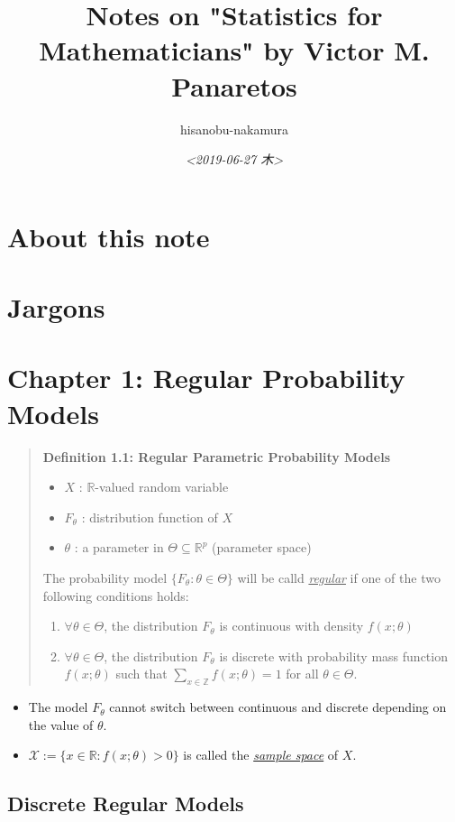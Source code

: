 \documentclass{article}
\author{hisanobu-nakamura}
\date{\textit{<2019-06-27 木>}}
\title{Notes on "Statistics for Mathematicians" by Victor M. Panaretos}
\begin{document}
\maketitle
\tableofcontents




\section{About this note}
\label{sec-1}

\section{Jargons}
\label{sec-2}

\section{Chapter 1: Regular Probability Models}
\label{sec-3}
\begin{quote}
\textbf{Definition 1.1: Regular Parametric Probability Models}\\
\begin{itemize}
\item $X$ : $\mathbb{R}$-valued random variable
\item $F_{\theta}$ : distribution function of $X$
\item $\theta$ : a parameter in $\Theta \subseteq \mathbb{R}^{p}$ (parameter space)
\end{itemize}

The probability model $\{F_{\theta} : \theta \in \Theta\}$ will be calld \emph{\uline{regular}} if one of the two following conditions holds:

\begin{enumerate}
\item $\forall \theta  \in \Theta$, the distribution $F_{\theta}$ is continuous with density $f(x; \theta)$
\item $\forall \theta  \in \Theta$, the distribution $F_{\theta}$ is discrete with probability mass function $f(x;\theta)$ such that $\sum_{x \in \mathbb{Z}} f(x;\theta) = 1$ for all $\theta \in \Theta$.
\end{enumerate}
\end{quote}

\begin{itemize}
\item The model $F_{\theta}$ cannot switch between continuous and discrete depending on the value of $\theta$.
\item $\mathcal{X} := \{x \in \mathbb{R}: f(x;\theta) > 0 \}$ is called the \emph{\uline{sample space}} of $X$.
\end{itemize}

\subsection{Discrete Regular Models}
\label{sec-3-1}
\end{document}
